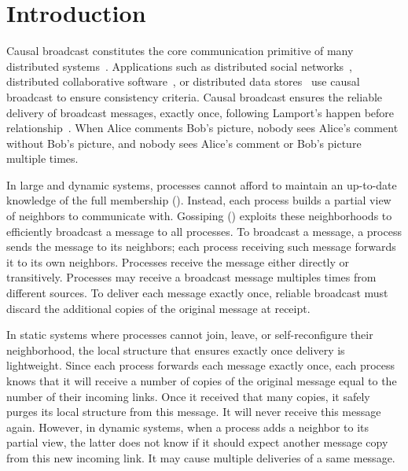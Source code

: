  
\section{Introduction}

Causal broadcast constitutes the core communication primitive of many
distributed systems~\cite{hadzilacos1994modular}. Applications such as
distributed social networks~\cite{borthakur2013petabyte}, distributed
collaborative software~\cite{heinrich2012exploiting,nedelec2016crate}, or
distributed data
stores~\cite{bailis2013bolton,bravo2017saturn,demers1987epidemic,lloyd2011cops,shapiro2011comprehensive}
use causal broadcast to ensure consistency criteria.  Causal broadcast ensures
the reliable delivery of broadcast messages, exactly once, following Lamport's
happen before relationship~\cite{lamport1978time}. When Alice comments Bob's
picture, nobody sees Alice's comment without Bob's picture, and nobody sees
Alice's comment or Bob's picture multiple times.

In large and dynamic systems, processes cannot afford to maintain an up-to-date
knowledge of the full membership (\REF). Instead, each process builds a partial view of
neighbors to communicate with. Gossiping (\REF) exploits these neighborhoods to
efficiently broadcast a message to all processes. To broadcast a message, a
process sends the message to its neighbors; each process receiving such message
forwards it to its own neighbors. Processes receive the message either directly
or transitively. Processes may receive a broadcast message multiples times from
different sources.  To deliver each message exactly once, reliable broadcast
must discard the additional copies of the original message at receipt.

In static systems where processes cannot join, leave, or self-reconfigure their
neighborhood, the local structure that ensures exactly once delivery is
lightweight.  Since each process forwards each message exactly once, each
process knows that it will receive a number of copies of the original message
equal to the number of their incoming links. Once it received that many copies,
it safely purges its local structure from this message. It will never receive
this message again.  However, in dynamic systems, when a process adds a neighbor
to its partial view, the latter does not know if it should expect another
message copy from this new incoming link. It may cause multiple deliveries of a
same message.

